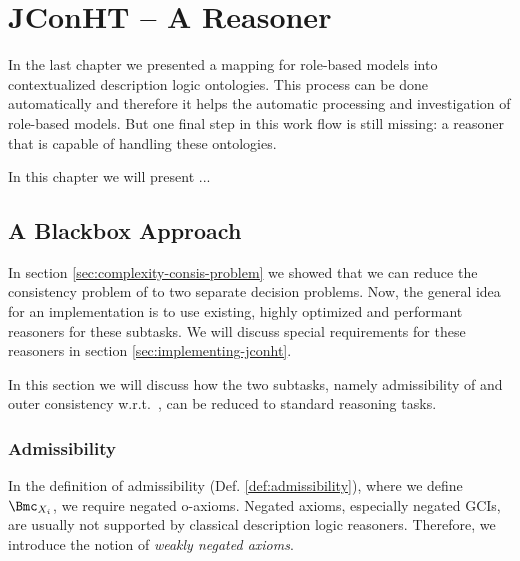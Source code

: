 
\chapter{JConHT -- A \texorpdfstring{\SHOIQSHOIQ}{SHOIQ[SHOIQ]} Reasoner}
\label{cha:jconht}

In the last chapter we presented a mapping for role-based models into contextualized description
logic ontologies. This process can be done automatically and therefore it helps the automatic
processing and investigation of role-based models. But one final step in this work flow is still
missing: a reasoner that is capable of handling these ontologies.

In this chapter we will present ...






\section{A Blackbox Approach}
\label{sec:blackbox-approach}

In section \ref{sec:complexity-consis-problem} we showed that we can reduce the consistency problem
of \LMLO to two separate decision problems. Now, the general idea for an implementation is to use
existing, highly optimized and performant reasoners for these subtasks. We will discuss special
requirements for these reasoners in section \ref{sec:implementing-jconht}. 

In this section we will discuss how the two subtasks, namely admissibility of \Xmc and outer
consistency w.r.t.\ \Xmc, can be reduced to standard reasoning tasks.


\subsection{Admissibility}
\label{sec:admissibility}

In the definition of admissibility (Def. \ref{def:admissibility}), where we define $\Bmc_{X_{i}}$,
we require negated o-axioms. Negated axioms, especially negated GCIs, are usually not supported by
classical description logic reasoners. Therefore, we introduce the notion of \emph{weakly negated
  axioms}.

